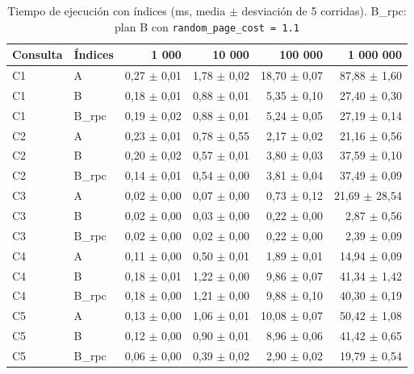 \begin{table}[H]
\centering
\small
\caption{Tiempo de ejecución con índices (ms, media $\pm$ desviación de 5 corridas). B\_rpc: plan B con \texttt{random\_page\_cost = 1.1}}
\label{tab:con_indices}
\begin{tabular}{llrrrr}
\toprule
Consulta & Índices & 1 000 & 10 000 & 100 000 & 1 000 000 \\
\midrule
C1 & A & 0,27 $\pm$ 0,01 & 1,78 $\pm$ 0,02 & 18,70 $\pm$ 0,07 & 87,88 $\pm$ 1,60 \\
C1 & B & 0,18 $\pm$ 0,01 & 0,88 $\pm$ 0,01 & 5,35 $\pm$ 0,10 & 27,40 $\pm$ 0,30 \\
C1 & B\_rpc & 0,19 $\pm$ 0,02 & 0,88 $\pm$ 0,01 & 5,24 $\pm$ 0,05 & 27,19 $\pm$ 0,14 \\
\midrule
C2 & A & 0,23 $\pm$ 0,01 & 0,78 $\pm$ 0,55 & 2,17 $\pm$ 0,02 & 21,16 $\pm$ 0,56 \\
C2 & B & 0,20 $\pm$ 0,02 & 0,57 $\pm$ 0,01 & 3,80 $\pm$ 0,03 & 37,59 $\pm$ 0,10 \\
C2 & B\_rpc & 0,14 $\pm$ 0,01 & 0,54 $\pm$ 0,00 & 3,81 $\pm$ 0,04 & 37,49 $\pm$ 0,09 \\
\midrule
C3 & A & 0,02 $\pm$ 0,00 & 0,07 $\pm$ 0,00 & 0,73 $\pm$ 0,12 & 21,69 $\pm$ 28,54 \\
C3 & B & 0,02 $\pm$ 0,00 & 0,03 $\pm$ 0,00 & 0,22 $\pm$ 0,00 & 2,87 $\pm$ 0,56 \\
C3 & B\_rpc & 0,02 $\pm$ 0,00 & 0,02 $\pm$ 0,00 & 0,22 $\pm$ 0,00 & 2,39 $\pm$ 0,09 \\
\midrule
C4 & A & 0,11 $\pm$ 0,00 & 0,50 $\pm$ 0,01 & 1,89 $\pm$ 0,01 & 14,94 $\pm$ 0,09 \\
C4 & B & 0,18 $\pm$ 0,01 & 1,22 $\pm$ 0,00 & 9,86 $\pm$ 0,07 & 41,34 $\pm$ 1,42 \\
C4 & B\_rpc & 0,18 $\pm$ 0,00 & 1,21 $\pm$ 0,00 & 9,88 $\pm$ 0,10 & 40,30 $\pm$ 0,19 \\
\midrule
C5 & A & 0,13 $\pm$ 0,00 & 1,06 $\pm$ 0,01 & 10,08 $\pm$ 0,07 & 50,42 $\pm$ 1,08 \\
C5 & B & 0,12 $\pm$ 0,00 & 0,90 $\pm$ 0,01 & 8,96 $\pm$ 0,06 & 41,42 $\pm$ 0,65 \\
C5 & B\_rpc & 0,06 $\pm$ 0,00 & 0,39 $\pm$ 0,02 & 2,90 $\pm$ 0,02 & 19,79 $\pm$ 0,54 \\
\bottomrule
\end{tabular}
\end{table}
